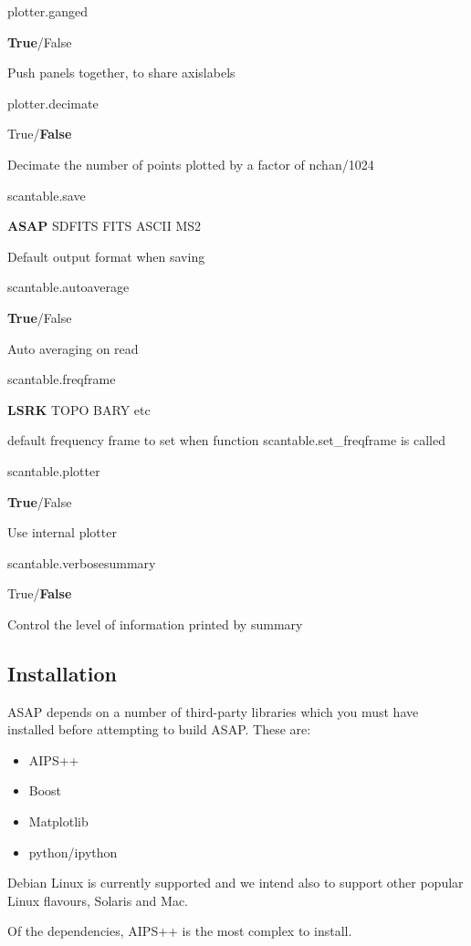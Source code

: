 \documentclass[11pt]{article}
\newcommand{\asaprc}[3]{
  \begin{minipage}[t]{45mm}#1\end{minipage}
  \begin{minipage}[t]{30mm}\raggedright #2\end{minipage}\hspace{3mm}
  \begin{minipage}[t]{\textwidth-75mm}#3\end{minipage}
}
\begin{document}
\asaprc{plotter.ganged}{{\bf True}/False}{Push panels together, to
share axislabels}

\asaprc{plotter.decimate}{True/{\bf False}}{Decimate the number of
points plotted by a factor of nchan/1024}


\asaprc{scantable.save}{{\bf ASAP} SDFITS FITS ASCII MS2}{Default output
format when saving}

\asaprc{scantable.autoaverage}{{\bf True}/False}{Auto averaging on
read}

\asaprc{scantable.freqframe}{{\bf LSRK} TOPO BARY etc}{default
frequency frame to set when function scantable.set\_freqframe is
called}

\asaprc{scantable.plotter}{{\bf True}/False}{Use internal plotter}

\asaprc{scantable.verbosesummary}{True/{\bf False}}{Control the level
of information printed by summary}

\subsection{Installation}

ASAP depends on a number of third-party libraries which you must
have installed before attempting to build ASAP. These are:

\begin{itemize}
\item AIPS++
\item Boost
\item Matplotlib
\item python/ipython
\end{itemize}

Debian Linux is currently supported and we intend also
to support other popular Linux flavours, Solaris and Mac.

Of the dependencies, AIPS++ is the most complex to install.

\printindex
\end{document}

